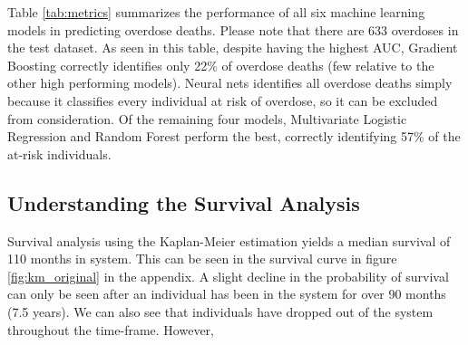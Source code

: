 \documentclass[twoside,10.5pt]{article}
\begin{document}
Table \ref{tab:metrics} summarizes the performance of all six machine learning models in predicting overdose deaths. Please note that there are 633 overdoses in the test dataset. As seen in this table, despite having the highest AUC, Gradient Boosting correctly identifies only 22\% of overdose deaths (few relative to the other high performing models). Neural nets identifies all overdose deaths simply because it classifies every individual at risk of overdose, so it can be excluded from consideration. Of the remaining four models, Multivariate Logistic Regression and Random Forest perform the best, correctly identifying 57\% of the at-risk individuals. 

\subsection{Understanding the Survival Analysis}
Survival analysis using the Kaplan-Meier estimation yields a median survival of 110 months in system. This can be seen in the survival curve in figure \ref{fig:km_original} in the appendix. A slight decline in the probability of survival can only be seen after an individual has been in the system for over 90 months (7.5 years). We can also see that individuals have dropped out of the system throughout the time-frame. However, 
\end{document}
